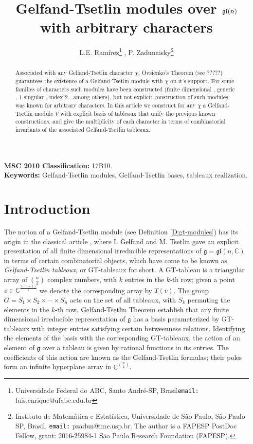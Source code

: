 \documentclass[11pt,fleqn]{article}
\title{Gelfand-Tsetlin modules over $\gl(n)$ with arbitrary characters}
\author{L.E. Ram\'irez\footnote{Universidade Federal do ABC, Santo Andr\'e-SP, 
Brasil\texttt{email:} luis.enrique@ufabc.edu.br} , 
P. Zadunaisky\footnote{Instituto de Matem\'atica e Estat\'istica, Universidade 
de S\~ao Paulo,  S\~ao Paulo SP, Brasil. \texttt{email:} pzadun@ime.usp.br.
The author is a FAPESP PostDoc Fellow, grant: 2016-25984-1 
S\~ao Paulo Research Foundation (FAPESP).}
}
\newcounter{para}[section]
\newcommand\CC{\mathbb C}
\newcommand\g{\mathfrak g}
\newcommand\gl{\mathfrak{gl}}
\begin{document}
\maketitle

\begin{abstract}
Associated with any Gelfand-Tsetlin character $\chi$, Ovsienko's Theorem (see \cite{Ov}?????) guarantees the existence of a Gelfand-Tsetlin module with $\chi$ on it's support. For some families of characters such modules have been constructed (finite dimensional \cite{GT-modules}, generic \cite{DFO-GT-modules} , $1$-singular \cite{FGR-1-singular}, index $2$ \cite{FGR-2-index}, among others), but not explicit construction of such modules was known for arbitrary characters. In this article we construct for any $\chi$ a Gelfand-Tsetlin module $V$ with explicit basis of tableaux that unify the previous known constructions, and give the multiplicity of each character in terms of combinatorial invariants of the associated Gelfand-Tsetlin tableaux.
\end{abstract}
\noindent\textbf{MSC 2010 Classification:} 17B10.\\
\noindent\textbf{Keywords:} Gelfand-Tsetlin modules, Gelfand-Tsetlin bases,
tableaux realization.

\section{Introduction}
The notion of a Gelfand-Tsetlin module (see Definition \ref{D:gt-modules}) has 
its origin in the classical article \cite{GT-modules}, where I. Gelfand and M. 
Tsetlin gave an explicit presentation of all finite dimensional irreducible 
representations of $\g = \gl(n,\CC)$ in terms of certain combinatorial 
objects, which have come to be known as \emph{Gelfand-Tsetlin tableaux}, or 
GT-tableaux for short. A GT-tableau is a triangular array of $\binom{n}{2}$ 
complex numbers, with $k$ entries in the $k$-th row; given a point $v \in 
\CC^{\frac{n(n+1)}{2}}$ we denote the corresponding array by $T(v)$. The group 
$G = S_1 \times S_2 \times \cdots \times S_n$ acts on the set of all tableaux, 
with $S_k$ permuting the elements in the $k$-th row. Gelfand-Tsetlin Theorem establish that any finite dimensional irreducible representation of $\g$ 
has a basis parameterized by GT-tableaux with integer entries satisfying certain betweenness relations. Identifying the elements of the basis with the 
corresponding GT-tableaux, the action of an element of $\g$ over a 
tableau is given by rational functions in its entries. The coefficients of
this action are known as the Gelfand-Tsetlin formulas; their poles form an 
infinite hyperplane array in $\CC^{\binom{n}{2}}$.
\end{document}
